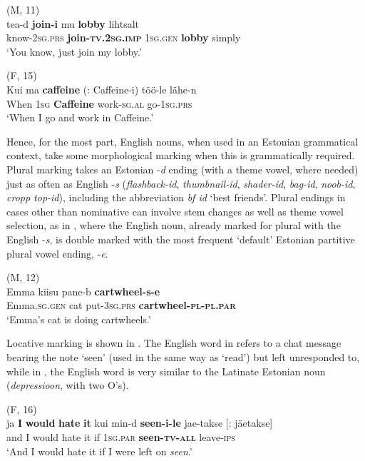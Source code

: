 \documentclass[output=paper]{langscibook}
\begin{document}
\ea%
    \label{ex:vihmanetal:4}
\ea (M, 11)\\ \label{ex:vihmanetal:4a}
\gll tea-d      \textbf{{join-i}}      mu \textbf{{lobby}}   lihtsalt\\
know-2\textsc{sg.prs}  \textbf{join-\textsc{tv}}\textbf{.2\textsc{sg.imp}}   1\textsc{sg.gen} \textbf{lobby}   simply\\
\glt ‘You know, just join my lobby.’

\ex (F, 15)\\ \label{ex:vihmanetal:4b}
\gll Kui  ma   {\textbf{{caffeine}} (: Caffeine-i)}  töö-le   lähe-n\\
When   1\textsc{sg}   \textbf{Caffeine}        work-\textsc{sg.al} go-1\textsc{sg.prs}\\
\glt ‘When I go and work in Caffeine.’
    \z
\z


Hence, for the most part, English nouns, when used in an Estonian grammatical context, take some morphological marking when this is grammatically required. Plural marking takes an Estonian -\textit{d} ending (with a theme vowel, where needed) just as often as English -\textit{s} (\textit{flashback-id}, \textit{thumbnail-id}, \textit{shader-id}, \textit{bag-id}, \textit{noob-id}, \textit{cropp top-id}), including the abbreviation \textit{bf id} ‘best friends’. Plural endings in cases other than nominative can involve stem changes as well as theme vowel selection, as in , where the English noun, already marked for plural with the English -\textit{s}, is double marked with the most frequent ‘default’ Estonian partitive plural vowel ending, -\textit{e}.

\ea (M, 12)\\
    \label{ex:vihmanetal:5}
\gll Emma      kiisu   pane-b   \textbf{{cartwheel-s-e}}   \\
Emma.\textsc{sg.gen}   cat  put{}-3\textsc{sg.prs}   \textbf{cartwheel{}-}\textbf{\textsc{pl-pl.par}}\\
\glt ‘Emma’s cat is doing cartwheels.’
\z

Locative marking is shown in . The English word in  refers to a chat message bearing the note ‘seen’ (used in the same way as ‘read’) but left unresponded to, while in , the English word is very similar to the Latinate Estonian noun (\textit{depressioon}, with two O’s).

\ea%
    \label{ex:vihmanetal:6}
\ea  (F, 16)\\ \label{ex:vihmanetal:6a}
\gll  ja   \textbf{{I} }  \textbf{would} \textbf{hate} \textbf{it}   kui min-d    \textbf{{seen-i-le}}  jae-takse [: jäetakse]\\
and   I  would hate it   if 1\textsc{sg.par}   \textbf{seen-\textsc{tv-all}}   leave-\textsc{ips}\\
\glt ‘And I would hate it if I were left on \textit{seen}.’
\end{document}
